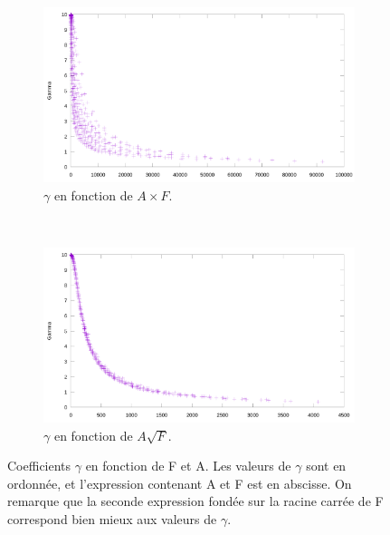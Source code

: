 	\begin{figure}[!htb]
		\centering
		\begin{subfigure}[t]{\textwidth}
			\centering
			\includegraphics[width=\textwidth]{figures/ch4/afVgamma}
			\caption{$\gamma$ en fonction de $A\times{}F$.}
			\label{fig:gammaAF}
		\end{subfigure}
		~
		\begin{subfigure}[t]{\textwidth}
			\centering
			\includegraphics[width=\textwidth]{figures/ch4/asqrtFVgamma}
			\caption{$\gamma$ en fonction de $A\sqrt{F}$.}
			\label{fig:gammaASQRTF}
		\end{subfigure}
		\caption[Coefficients $\gamma$ en fonction de F et A, bis]{Coefficients $\gamma$ en fonction de F et A. Les valeurs de $\gamma$ sont en ordonnée, et l'expression contenant A et F est en abscisse. On remarque que la seconde expression fondée sur la racine carrée de F correspond bien mieux aux valeurs de $\gamma$.}
		\label{fig:gammaVentropy}
	\end{figure}

